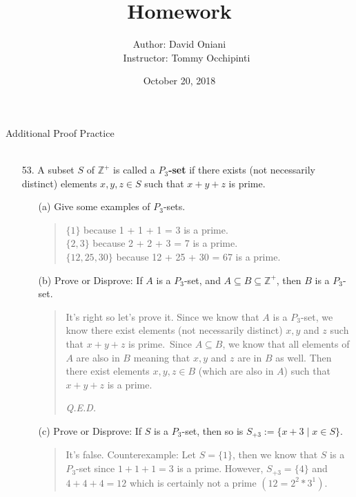 \documentclass[12pt, a4paper]{article}                      %
\title{\bf{Homework \textnumero 8}}
\author{Author: David Oniani
\\
\ \ \ Instructor: Tommy Occhipinti}
\date{October 20, 2018}
\begin{document}
\maketitle

{\Large Additional Proof Practice}
\\\\
\begin{itemize}
\item[53.]
A subset $S$ of $\mathbb{Z}^{+}$ is called a $P_3$\textbf{-set} if there exists (not necessarily distinct) elements
$x, y, z \in S$ such that $x + y + z$ is prime.

\begin{itemize}
\item[(a)]
Give some examples of $P_3$-sets.
\begin{quote}
$\{1\}$ because 1 + 1 + 1 = 3 is a prime.\\
$\{2, 3\}$ because 2 + 2 + 3 = 7 is a prime.\\
$\{12, 25, 30\}$ because 12 + 25 + 30 = 67 is a prime.
\end{quote}

\item[]

\item[(b)]
Prove or Disprove: If $A$ is a $P_3$-set, and $A \subseteq B \subseteq \mathbb{Z}^+$, then $B$ is a $P_3$-set.
\begin{quote}
It's right so let's prove it.
Since we know that $A$ is a $P_3$-set, we know there exist elements (not necessarily distinct) $x,y$ and $z$ such that
$x + y + z$ is prime.\ Since $A \subseteq B$, we know that all elements of $A$ are also in $B$ meaning that $x,y$ and $z$
are in $B$ as well. Then there exist elements $x,y,z \in B$ (which are also in $A$) such that $x + y + z$ is a prime.
\begin{flushright}
\textit{Q.E.D.}
\end{flushright}
\end{quote}

\item[]

\item[(c)]
Prove or Disprove: If $S$ is a $P_3$-set, then so is $S_{+3} := \{x + 3 \mid x \in S\}$.
\begin{quote}
It's false. Counterexample: Let $S = \{1\}$, then we know that $S$ is a $P_3$-set since $1 + 1 + 1 = 3$
is a prime. However, $S_{+3} = \{4\}$ and $4 + 4 + 4 = 12$ which is certainly not a prime $(12 = 2^2 * 3^1)$.
\end{quote}


\end{itemize}
\end{itemize}
\end{document}
